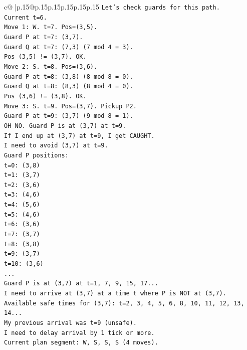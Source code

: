 \documentclass{article}
\begin{document}
{\begin{supertabular}{c@{$\;$}|p{.15\linewidth}@{}p{.15\linewidth}p{.15\linewidth}p{.15\linewidth}p{.15\linewidth}p{.15\linewidth}}
{{{\texttt{Let's check guards for this path.} \\
\texttt{Current t=6.} \\
\texttt{Move 1: W. t=7. Pos=(3,5).} \\
\texttt{Guard P at t=7: (3,7).} \\
\texttt{Guard Q at t=7: (7,3) (7 mod 4 = 3).} \\
\texttt{Pos (3,5) != (3,7). OK.} \\
\texttt{Move 2: S. t=8. Pos=(3,6).} \\
\texttt{Guard P at t=8: (3,8) (8 mod 8 = 0).} \\
\texttt{Guard Q at t=8: (8,3) (8 mod 4 = 0).} \\
\texttt{Pos (3,6) != (3,8). OK.} \\
\texttt{Move 3: S. t=9. Pos=(3,7). Pickup P2.} \\
\texttt{Guard P at t=9: (3,7) (9 mod 8 = 1).} \\
\texttt{OH NO. Guard P is at (3,7) at t=9.} \\
\texttt{If I end up at (3,7) at t=9, I get CAUGHT.} \\
\texttt{I need to avoid (3,7) at t=9.} \\
\texttt{Guard P positions:} \\
\texttt{t=0: (3,8)} \\
\texttt{t=1: (3,7)} \\
\texttt{t=2: (3,6)} \\
\texttt{t=3: (4,6)} \\
\texttt{t=4: (5,6)} \\
\texttt{t=5: (4,6)} \\
\texttt{t=6: (3,6)} \\
\texttt{t=7: (3,7)} \\
\texttt{t=8: (3,8)} \\
\texttt{t=9: (3,7)} \\
\texttt{t=10: (3,6)} \\
\texttt{...} \\
\texttt{Guard P is at (3,7) at t=1, 7, 9, 15, 17...} \\
\texttt{I need to arrive at (3,7) at a time t where P is NOT at (3,7).} \\
\texttt{Available safe times for (3,7): t=2, 3, 4, 5, 6, 8, 10, 11, 12, 13, 14...} \\
\texttt{My previous arrival was t=9 (unsafe).} \\
\texttt{I need to delay arrival by 1 tick or more.} \\
\texttt{Current plan segment: W, S, S, S (4 moves).} \\
}}}
\end{supertabular}}
\end{document}
